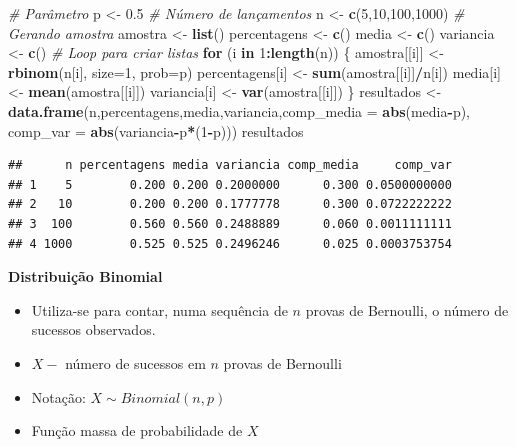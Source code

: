 \documentclass[
]{book}
\newenvironment{Shaded}{\begin{snugshade}}{\end{snugshade}}
\newcommand{\AttributeTok}[1]{\textcolor[rgb]{0.13,0.29,0.53}{#1}}
\newcommand{\CommentTok}[1]{\textcolor[rgb]{0.56,0.35,0.01}{\textit{#1}}}
\newcommand{\ControlFlowTok}[1]{\textcolor[rgb]{0.13,0.29,0.53}{\textbf{#1}}}
\newcommand{\DecValTok}[1]{\textcolor[rgb]{0.00,0.00,0.81}{#1}}
\newcommand{\FloatTok}[1]{\textcolor[rgb]{0.00,0.00,0.81}{#1}}
\newcommand{\FunctionTok}[1]{\textcolor[rgb]{0.13,0.29,0.53}{\textbf{#1}}}
\newcommand{\NormalTok}[1]{#1}
\newcommand{\OtherTok}[1]{\textcolor[rgb]{0.56,0.35,0.01}{#1}}
\newcommand{\SpecialCharTok}[1]{\textcolor[rgb]{0.81,0.36,0.00}{\textbf{#1}}}
\begin{document}
\begin{Shaded}
\begin{Highlighting}[]
\CommentTok{\# Parâmetro}
\NormalTok{p }\OtherTok{\textless{}{-}} \FloatTok{0.5}
\CommentTok{\# Número de lançamentos}
\NormalTok{n }\OtherTok{\textless{}{-}} \FunctionTok{c}\NormalTok{(}\DecValTok{5}\NormalTok{,}\DecValTok{10}\NormalTok{,}\DecValTok{100}\NormalTok{,}\DecValTok{1000}\NormalTok{)}
\CommentTok{\# Gerando amostra}
\NormalTok{amostra }\OtherTok{\textless{}{-}} \FunctionTok{list}\NormalTok{()}
\NormalTok{percentagens }\OtherTok{\textless{}{-}} \FunctionTok{c}\NormalTok{()}
\NormalTok{media }\OtherTok{\textless{}{-}} \FunctionTok{c}\NormalTok{()}
\NormalTok{variancia }\OtherTok{\textless{}{-}} \FunctionTok{c}\NormalTok{()}
\CommentTok{\# Loop para criar listas}
\ControlFlowTok{for}\NormalTok{ (i }\ControlFlowTok{in} \DecValTok{1}\SpecialCharTok{:}\FunctionTok{length}\NormalTok{(n)) \{}
\NormalTok{  amostra[[i]] }\OtherTok{\textless{}{-}} \FunctionTok{rbinom}\NormalTok{(n[i], }\AttributeTok{size=}\DecValTok{1}\NormalTok{, }\AttributeTok{prob=}\NormalTok{p)}
\NormalTok{  percentagens[i] }\OtherTok{\textless{}{-}} \FunctionTok{sum}\NormalTok{(amostra[[i]]}\SpecialCharTok{/}\NormalTok{n[i])}
\NormalTok{  media[i] }\OtherTok{\textless{}{-}} \FunctionTok{mean}\NormalTok{(amostra[[i]])}
\NormalTok{  variancia[i] }\OtherTok{\textless{}{-}} \FunctionTok{var}\NormalTok{(amostra[[i]])}
\NormalTok{\}}
\NormalTok{resultados }\OtherTok{\textless{}{-}} \FunctionTok{data.frame}\NormalTok{(n,percentagens,media,variancia,}\AttributeTok{comp\_media =} \FunctionTok{abs}\NormalTok{(media}\SpecialCharTok{{-}}\NormalTok{p), }\AttributeTok{comp\_var =} \FunctionTok{abs}\NormalTok{(variancia}\SpecialCharTok{{-}}\NormalTok{p}\SpecialCharTok{*}\NormalTok{(}\DecValTok{1}\SpecialCharTok{{-}}\NormalTok{p)))}
\NormalTok{resultados}
\end{Highlighting}
\end{Shaded}

\begin{verbatim}
##      n percentagens media variancia comp_media     comp_var
## 1    5        0.200 0.200 0.2000000      0.300 0.0500000000
## 2   10        0.200 0.200 0.1777778      0.300 0.0722222222
## 3  100        0.560 0.560 0.2488889      0.060 0.0011111111
## 4 1000        0.525 0.525 0.2496246      0.025 0.0003753754
\end{verbatim}

\textbf{Distribuição Binomial}

\begin{itemize}
\item
  Utiliza-se para contar, numa sequência de \(n\) provas de Bernoulli, o
  número de sucessos observados.
\item
  \(X -\) número de sucessos em \(n\) provas de Bernoulli
\item
  Notação: \(X \sim Binomial(n,p)\)
\item
  Função massa de probabilidade de \(X\)
\end{itemize}
\end{document}
